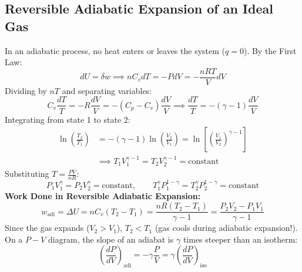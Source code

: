 \documentclass[10pt,twoside,openright]{book}
\begin{document}
\subsection{Reversible Adiabatic Expansion of an Ideal Gas}
In an adiabatic process, no heat enters or leaves the system ($q = 0$). By the First Law:
\begin{equation}
  dU = \delta w \implies n C_v dT = -P dV = -\frac{n R T}{V} dV
\end{equation}
Dividing by $n T$ and separating variables:
\begin{equation}
  C_v \frac{dT}{T} = -R \frac{dV}{V} = -(C_p - C_v)\frac{dV}{V} \implies \frac{dT}{T} = -(\gamma - 1)\frac{dV}{V}
\end{equation}
Integrating from state 1 to state 2:
\begin{align}
  \ln\left(\frac{T_2}{T_1}\right) &= -(\gamma - 1)\ln\left(\frac{V_2}{V_1}\right) = \ln\left[\left(\frac{V_1}{V_2}\right)^{\gamma - 1}\right] \\
  &\implies T_1 V_1^{\gamma - 1} = T_2 V_2^{\gamma - 1} = \text{constant}
\end{align}
Substituting $T = \frac{P V}{n R}$:
\begin{equation}
  P_1 V_1^\gamma = P_2 V_2^\gamma = \text{constant}, \qquad T_1^\gamma P_1^{1-\gamma} = T_2^\gamma P_2^{1-\gamma} = \text{constant}
\end{equation}
\textbf{Work Done in Reversible Adiabatic Expansion:}
\begin{equation}
  w_{\text{adi}} = \Delta U = n C_v(T_2 - T_1) = \frac{n R(T_2 - T_1)}{\gamma - 1} = \frac{P_2 V_2 - P_1 V_1}{\gamma - 1}
\end{equation}
Since the gas expands ($V_2 > V_1$), $T_2 < T_1$ (gas cools during adiabatic expansion!). On a $P-V$ diagram, the slope of an adiabat is $\gamma$ times steeper than an isotherm:
\begin{equation}
  \left(\frac{dP}{dV}\right)_{\text{adi}} = -\gamma \frac{P}{V} = \gamma \left(\frac{dP}{dV}\right)_{\text{iso}}
\end{equation}
\end{document}
